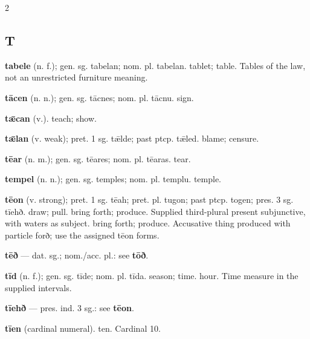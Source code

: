 \begin{multicols*}{2}
\subsection*{T}
\textbf{tabele} (n. f.); gen. sg. tabelan; nom. pl. tabelan. tablet; table. Tables of the law, not an unrestricted furniture meaning.\par
\textbf{tācen} (n. n.); gen. sg. tācnes; nom. pl. tācnu. sign.\par
\textbf{tǣcan} (v.). teach; show.\par
\textbf{tǣlan} (v. weak); pret. 1 sg. tǣlde; past ptcp. tǣled. blame; censure.\par
\textbf{tēar} (n. m.); gen. sg. tēares; nom. pl. tēaras. tear.\par
\textbf{tempel} (n. n.); gen. sg. temples; nom. pl. templu. temple.\par
\textbf{tēon} (v. strong); pret. 1 sg. tēah; pret. pl. tugon; past ptcp. togen; pres. 3 sg. tīehð. draw; pull. bring forth; produce. Supplied third-plural present subjunctive, with waters as subject. bring forth; produce. Accusative thing produced with particle forð; use the assigned tēon forms.\par
\textbf{tēð} — dat. sg.; nom./acc. pl.: see \textbf{tōð}.\par
\textbf{tīd} (n. f.); gen. sg. tīde; nom. pl. tīda. season; time. hour. Time measure in the supplied intervals.\par
\textbf{tīehð} — pres. ind. 3 sg.: see \textbf{tēon}.\par
\textbf{tīen} (cardinal numeral). ten. Cardinal 10.\par

\end{multicols*}
